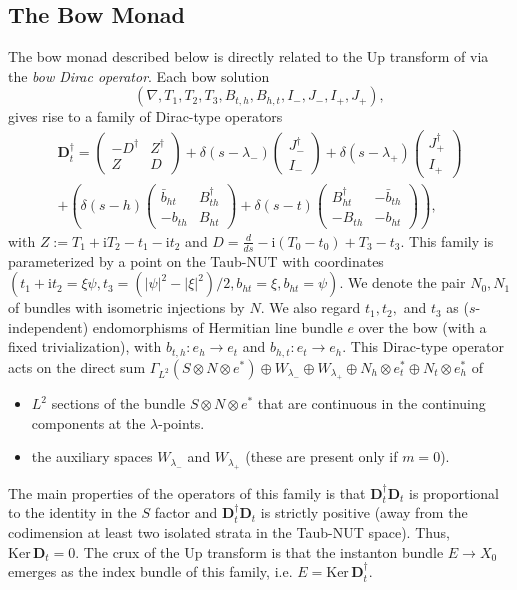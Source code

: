 \documentclass[12pt]{article}
\theoremstyle{definition}
\theoremstyle{remark}
\numberwithin{theorem}{section}
\renewcommand{\i}{\mathrm{i}}
\begin{document}
 \subsection{The Bow Monad}
 The bow monad described below is directly related to the Up transform of \cite{Second} via the {\em bow Dirac operator}.  Each bow solution  
 $$(\nabla, T_1, T_2, T_3, B_{t,h},B_{h,t},I_-,J_-,I_+,J_+),$$ 
 gives rise to a family of Dirac-type operators
\begin{multline}
{\mathbf D}_t^\dagger=
\begin{pmatrix}
-D^\dagger & Z^\dagger\\
Z & D
\end{pmatrix}
+\delta(s-\lambda_-)\begin{pmatrix} J_{-}^\dagger \\ I_{-}\end{pmatrix}
+\delta(s-\lambda_+)\begin{pmatrix} J_{+}^\dagger \\ I_{+}\end{pmatrix}\nonumber\\
+\left(\delta(s-h)\begin{pmatrix}\bar{b}_{ht} & B_{th}^\dagger \\  -b_{th} & B_{ht} \end{pmatrix}
+\delta(s-t)\begin{pmatrix}  B_{ht}^\dagger & -\bar{b}_{th} \\ 
 -B_{th} & - b_{ht} \end{pmatrix}\right),
\end{multline}
with $Z:=T_1+\i T_2-t_1-\i t_2$  and $D=\frac{d}{ds}-\i(T_0-t_0)+T_3-t_3.$ 
This family is parameterized by a point on the Taub-NUT with  coordinates $(t_1+\i t_2=\xi\psi,t_3=(|\psi|^2-|\xi|^2)/2,b_{ht}=\xi,b_{ht}=\psi).$
We denote the pair $N_0, N_1$ of bundles with isometric injections by $N$. We also regard $t_1,t_2,$ and $t_3$ as ($s$-independent) endomorphisms of Hermitian line bundle $e$ over the bow (with a fixed trivialization), with $b_{t,h}:e_h\rightarrow e_t$ and $b_{h,t}:e_t\rightarrow e_h.$ 
This Dirac-type operator acts on the direct sum $\Gamma_{L^2}(S\otimes N\otimes e^*)\oplus W_{\lambda_-}\oplus W_{\lambda_+}\oplus N_h\otimes e_t^*\oplus N_t\otimes e_h^*$ of
\begin{itemize}
\item
 $L^2$ sections of the bundle $S\otimes N\otimes e^*$ that are continuous in the continuing components at the $\lambda$-points.  
\item
the auxiliary spaces $W_{\lambda_-}$ and $W_{\lambda_+}$ (these are present only if $m=0$). 
\end{itemize}
The main properties of the operators of this family is that ${\mathbf D}_t^\dagger {\mathbf D}_t$ is proportional to the identity in the $S$ factor and  ${\mathbf D}_t^\dagger {\mathbf D}_t$ is strictly positive (away from the codimension at least two isolated strata in the Taub-NUT space).   Thus, $\mathrm{Ker}\,  {\mathbf D}_t=0.$ The crux of the Up transform is that the instanton bundle $E\rightarrow X_0$ emerges as the index bundle  of this family, i.e. $E=\mathrm{Ker}\,{\mathbf D}_t^\dagger.$
\end{document}
